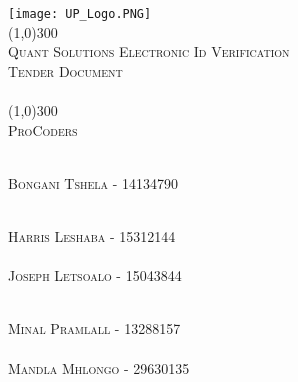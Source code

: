 \documentclass[runningheads,a4paper]{article}
\begin{document}
	
	\begin{titlepage}
		\begin{center}
			\texttt{[image: UP\_Logo.PNG]}  \\
			[1cm]
			\line(1,0){300} \\
			[0.3cm]
			\textsc{\Large
				Quant Solutions Electronic Id Verification\\
				Tender Document\\
				\hfill
			}\\
			[0.1cm]
			\line(1,0){300} \\
			[0.7cm]
			\textsc{\Large
				ProCoders
			} \\
		\end{center}
		
		\begin{center}
			\begin{centre}
				\textsc{\large\\
					Bongani Tshela - 14134790\\ 
				}
			
    				\textsc{\large\\
    					Harris Leshaba - 15312144\\ 
    				}
				\textsc{\large\\
					Joseph Letsoalo - 15043844\\ 
				}
				
				\textsc{\large\\
					Minal Pramlall - 13288157\\ 
				}
				\textsc{\large\\
					Mandla Mhlongo - 29630135\\ 
				}
			\end{centre}
			
			
		\end{center}
	\end{titlepage}
	
	\begingroup
	
	\tableofcontents
	\endgroup
	\newpage
	
\end{document}
